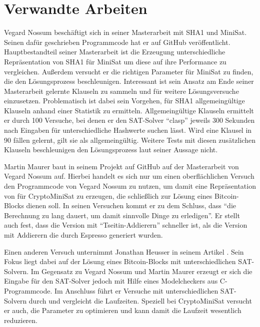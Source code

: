 \section{Verwandte Arbeiten}
\label{sec:otherwork}

Vegard Nossum beschäftigt sich in seiner Masterarbeit \cite{vegard:1} mit SHA1 und MiniSat.
Seinen dafür geschrieben Programmcode hat er auf GitHub \cite{vegard:2} veröffentlicht.
Hauptbestandteil seiner Masterarbeit ist die Erzeugung unterschiedliche Repräsentation von SHA1 für MiniSat
um diese auf ihre Performance zu vergleichen. Außerdem versucht er die richtigen Parameter für
MiniSat zu finden, die den Lösungsprozess beschleunigen. Interessant ist sein Ansatz am Ende seiner
Masterarbeit gelernte Klauseln zu sammeln und für weitere Lösungsversuche einzusetzen. Problematisch
ist dabei sein Vorgehen, für SHA1 allgemeingültige Klauseln anhand einer Statistik zu ermitteln.
Allgemeingültige Klauseln ermittelt er durch 100 Versuche, bei denen er den SAT-Solver "`clasp"'
jeweils 300 Sekunden nach Eingaben für unterschiedliche Hashwerte suchen lässt. Wird eine Klausel
in 90 fällen gelernt, gilt sie als allgemeingültig. Weitere Tests mit diesen zusätzlichen Klauseln
beschleunigen den Lösungsprozess laut seiner Aussage nicht.

Martin Maurer baut in seinem Projekt auf GitHub \cite{capiman} auf der Masterarbeit von Vegard Nossum auf.
Hierbei handelt es sich nur um einen oberflächlichen Versuch den Programmcode von Vegard Nossum zu nutzen,
um damit eine Repräsentation von  für CryptoMiniSat zu erzeugen, die schließlich zur Lösung eines
Bitcoin-Blocks dienen soll. In seinen Versuchen kommt er zu dem Schluss, dass "`die Berechnung zu lang dauert,
um damit sinnvolle Dinge zu erledigen"'. Er stellt auch fest, dass die Version mit "`Tseitin-Addierern"'
schneller ist, als die Version mit Addierern die durch Espresso generiert wurden.

Einen anderen Versuch unternimmt Jonathan Heusser in seinem Artikel \cite{jona:1}. Sein Fokus liegt dabei
auf der Lösung eines Bitcoin-Blocks mit unterschiedlichen SAT-Solvern. Im Gegensatz zu Vegard Nossum und
Martin Maurer erzeugt er sich die Eingabe für den SAT-Solver jedoch mit Hilfe eines Modelcheckers aus
C-Programmcode. Im Anschluss führt er Versuche mit unterschiedlichen SAT-Solvern durch und vergleicht die
Laufzeiten. Speziell bei CryptoMiniSat versucht er auch, die Parameter zu optimieren und kann damit die
Laufzeit wesentlich reduzieren.